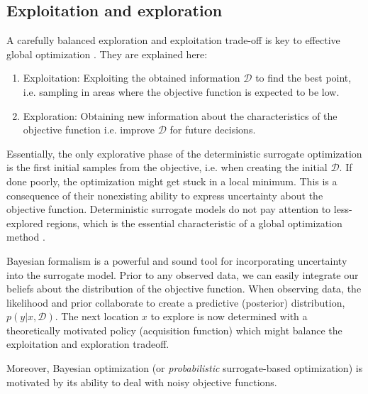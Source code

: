 \subsection{Exploitation and exploration}
A carefully balanced exploration and exploitation trade-off is key to effective 
global optimization \cite[11]{bayesoptbook}. They are explained here:
\begin{enumerate}
    \item Exploitation: Exploiting the obtained information $\mathcal{D}$ to find the best point,
    i.e. sampling in areas where the objective function is expected to be low. 
    \item Exploration: Obtaining new information about the characteristics of the objective
    function i.e. improve $\mathcal{D}$ for future decisions.
\end{enumerate} 
Essentially, the only explorative phase of the deterministic surrogate optimization is the first
initial samples from the objective, i.e. when creating the initial $\mathcal{D}$. If done poorly,
the optimization might get stuck in a local minimum. This is a consequence of their nonexisting
ability to express uncertainty about the objective function. Deterministic surrogate models do not
pay attention to less-explored regions, which is the essential characteristic of a global
optimization method \cite{GlobalOptimization}. 

Bayesian formalism is a powerful and sound tool for incorporating uncertainty into the surrogate
model. Prior to any observed data, we can easily integrate our beliefs about the distribution of
the objective function. When observing data, the likelihood and prior collaborate to create a
predictive (posterior) distribution, $p(y|x,\mathcal{D})$. The next location $x$ to explore is now
determined with a theoretically motivated policy (acquisition function) which might balance the
exploitation and exploration tradeoff. 

Moreover, Bayesian optimization (or \textit{probabilistic} surrogate-based optimization) is motivated by
its ability to deal with noisy objective functions. 


